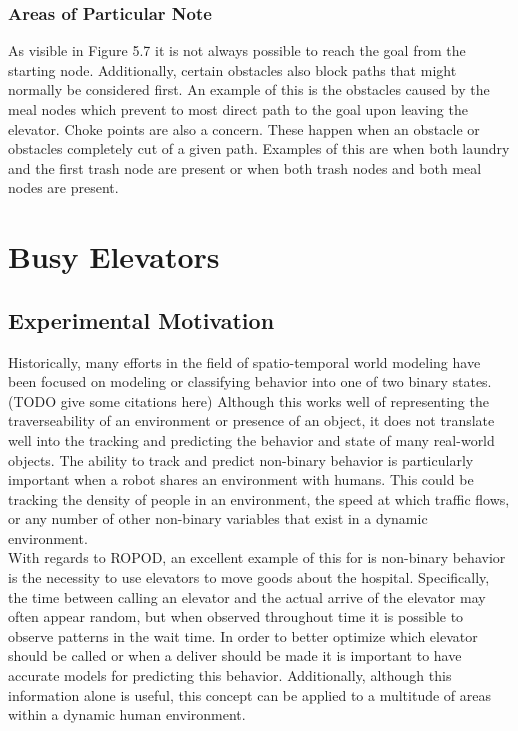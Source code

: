   \subsubsection{ Areas of Particular Note }

  As visible in Figure 5.7 it is not always possible to reach the goal from the
  starting node. Additionally, certain obstacles also block paths that might
  normally be considered first. An example of this is the obstacles caused by
  the meal nodes which prevent to most direct path to the goal upon leaving
  the elevator. Choke points are also a concern. These happen when an obstacle
  or obstacles completely cut of a given path. Examples of this are when both
  laundry and the first trash node are present or when both trash nodes and both
  meal nodes are present.
  \clearpage





  \section{ Busy Elevators }

  \subsection{ Experimental Motivation }

  Historically, many efforts in the field of spatio-temporal world modeling
  have been focused on modeling or classifying behavior into one of two binary
  states. (TODO give some citations here) Although this works well of
  representing the traverseability of an environment or presence of an object,
  it does not translate well into the tracking and predicting the behavior and
  state of many real-world objects. The ability to track and predict
  non-binary behavior is particularly important when a robot shares an
  environment with humans. This could be tracking the density of people in an
  environment, the speed at which traffic flows, or any number of other
  non-binary variables that exist in a dynamic environment. \\

  With regards to ROPOD, an excellent example of this for is non-binary
  behavior is the necessity to use elevators to move goods about the hospital.
  Specifically, the time between calling an elevator and the actual arrive of
  the elevator may often appear random, but when observed throughout time
  it is possible to observe patterns in the wait time. In order to better
  optimize which elevator should be called or when a deliver should be made it
  is important to have accurate models for predicting this behavior.
  Additionally, although this information alone is useful, this concept can
  be applied to a multitude of areas within a dynamic human environment. \\

